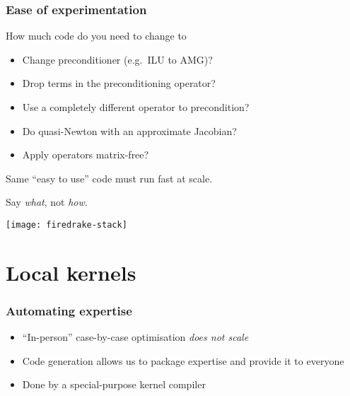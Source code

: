 \documentclass[presentation]{beamer}
\begin{document}
\begin{frame}
  \frametitle{Ease of experimentation}
  How much code do you need to change to
  \begin{itemize}
  \item Change preconditioner (e.g.~ILU to AMG)?
  \item Drop terms in the preconditioning operator?
  \item Use a completely different operator to precondition?
  \item Do quasi-Newton with an approximate Jacobian?
  \item Apply operators matrix-free?
  \end{itemize}

  Same ``easy to use'' code must run fast at scale.
\end{frame}

\begin{frame}[standout]
  Say \emph{what}, not \emph{how}.
\end{frame}

\begin{frame}
  \texttt{[image: firedrake-stack]}
\end{frame}

\section{Local kernels}

\begin{frame}
  \frametitle{Automating expertise}
  \begin{itemize}
  \item ``In-person'' case-by-case optimisation \emph{does not scale}
  \item Code generation allows us to package expertise and provide it
    to everyone
  \item Done by a special-purpose kernel compiler
  \end{itemize}
\end{frame}
\end{document}
